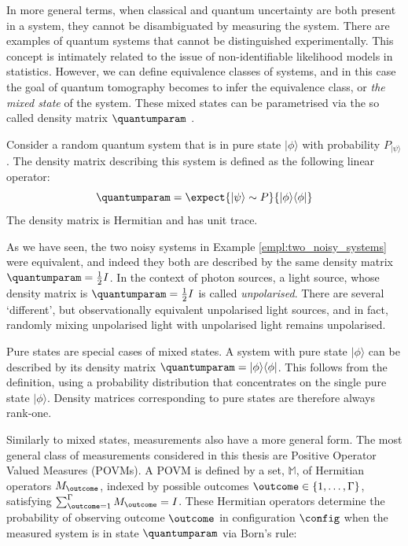 In more general terms, when classical and quantum uncertainty are both present in a system, they cannot be disambiguated by measuring the system. There are examples of quantum systems that cannot be distinguished experimentally. This concept is intimately related to the issue of non-identifiable likelihood models \citep{Teicher1961} in statistics. However, we can define equivalence classes of systems, and in this case the goal of quantum tomography becomes to infer the equivalence class, or \emph{the mixed state} of the system. These mixed states can be parametrised via the so called density matrix $\quantumparam$ \citep{Fano1957}.

\begin{definition}
Consider a random quantum system that is in pure state $\vert\phi\rangle$ with probability $P_{\vert\psi\rangle}$. The density matrix describing this system is defined as the following linear operator:
\begin{equation}
	\quantumparam = \expect{\vert\psi\rangle\sim P}{\vert\phi\rangle\langle\phi\vert}
\end{equation}
The density matrix is Hermitian and has unit trace.
\end{definition}

As we have seen, the two noisy systems in Example \ref{empl:two_noisy_systems} were equivalent, and indeed they both are described by the same density matrix $\quantumparam=\frac{1}{2}I$. In the context of photon sources, a light source, whose density matrix is $\quantumparam=\frac{1}{2}I$ is called \emph{unpolarised}. There are several `different', but observationally equivalent unpolarised light sources, and in fact, randomly mixing unpolarised light with unpolarised light remains unpolarised.

Pure states are special cases of mixed states. A system with pure state $\vert \phi \rangle$ can be described by its density matrix $\quantumparam = \vert \phi \rangle \langle \phi \vert$. This follows from the definition, using a probability distribution that concentrates on the single pure state $\vert \phi \rangle$. Density matrices corresponding to pure states are therefore always rank-one. 

Similarly to mixed states, measurements also have a more general form. The most general class of measurements considered in this thesis are Positive Operator Valued Measures (POVMs). A POVM is defined by a set, $\mathbb{M}$, of Hermitian operators $M_{\outcome}$, indexed by possible outcomes $\outcome\in\{1,\ldots,\Gamma\}$, satisfying $\sum_{\outcome=1}^{\Gamma} M_{\outcome} = I$. These Hermitian operators determine the probability of observing outcome $\outcome$ in configuration $\config$ when the measured system is in state $\quantumparam$ via Born's rule:

